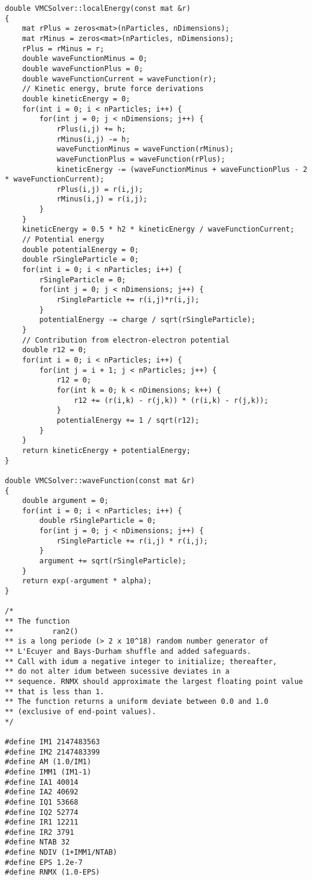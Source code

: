 \documentclass[%
twoside,                 %
final,                   %
10pt]{article}
\begin{document}
\begin{verbatim}
double VMCSolver::localEnergy(const mat &r)
{
    mat rPlus = zeros<mat>(nParticles, nDimensions);
    mat rMinus = zeros<mat>(nParticles, nDimensions);
    rPlus = rMinus = r;
    double waveFunctionMinus = 0;
    double waveFunctionPlus = 0;
    double waveFunctionCurrent = waveFunction(r);
    // Kinetic energy, brute force derivations
    double kineticEnergy = 0;
    for(int i = 0; i < nParticles; i++) {
        for(int j = 0; j < nDimensions; j++) {
            rPlus(i,j) += h;
            rMinus(i,j) -= h;
            waveFunctionMinus = waveFunction(rMinus);
            waveFunctionPlus = waveFunction(rPlus);
            kineticEnergy -= (waveFunctionMinus + waveFunctionPlus - 2 * waveFunctionCurrent);
            rPlus(i,j) = r(i,j);
            rMinus(i,j) = r(i,j);
        }
    }
    kineticEnergy = 0.5 * h2 * kineticEnergy / waveFunctionCurrent;
    // Potential energy
    double potentialEnergy = 0;
    double rSingleParticle = 0;
    for(int i = 0; i < nParticles; i++) {
        rSingleParticle = 0;
        for(int j = 0; j < nDimensions; j++) {
            rSingleParticle += r(i,j)*r(i,j);
        }
        potentialEnergy -= charge / sqrt(rSingleParticle);
    }
    // Contribution from electron-electron potential
    double r12 = 0;
    for(int i = 0; i < nParticles; i++) {
        for(int j = i + 1; j < nParticles; j++) {
            r12 = 0;
            for(int k = 0; k < nDimensions; k++) {
                r12 += (r(i,k) - r(j,k)) * (r(i,k) - r(j,k));
            }
            potentialEnergy += 1 / sqrt(r12);
        }
    }
    return kineticEnergy + potentialEnergy;
}

double VMCSolver::waveFunction(const mat &r)
{
    double argument = 0;
    for(int i = 0; i < nParticles; i++) {
        double rSingleParticle = 0;
        for(int j = 0; j < nDimensions; j++) {
            rSingleParticle += r(i,j) * r(i,j);
        }
        argument += sqrt(rSingleParticle);
    }
    return exp(-argument * alpha);
}

/*
** The function
**         ran2()
** is a long periode (> 2 x 10^18) random number generator of
** L'Ecuyer and Bays-Durham shuffle and added safeguards.
** Call with idum a negative integer to initialize; thereafter,
** do not alter idum between sucessive deviates in a
** sequence. RNMX should approximate the largest floating point value
** that is less than 1.
** The function returns a uniform deviate between 0.0 and 1.0
** (exclusive of end-point values).
*/

#define IM1 2147483563
#define IM2 2147483399
#define AM (1.0/IM1)
#define IMM1 (IM1-1)
#define IA1 40014
#define IA2 40692
#define IQ1 53668
#define IQ2 52774
#define IR1 12211
#define IR2 3791
#define NTAB 32
#define NDIV (1+IMM1/NTAB)
#define EPS 1.2e-7
#define RNMX (1.0-EPS)


\end{verbatim}
\end{document}
